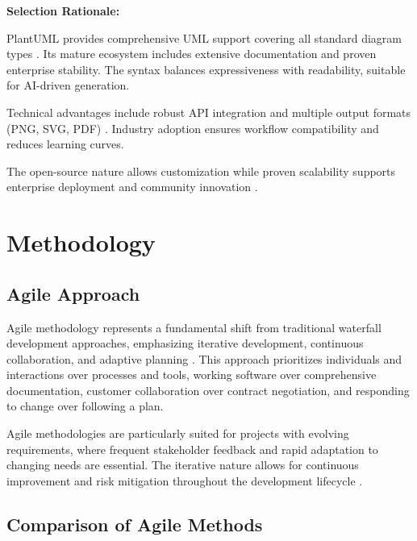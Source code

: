 \textbf{Selection Rationale:}

PlantUML provides comprehensive UML support covering all standard diagram types \cite{plantuml_documentation}. Its mature ecosystem includes extensive documentation and proven enterprise stability. The syntax balances expressiveness with readability, suitable for AI-driven generation.

Technical advantages include robust API integration and multiple output formats (PNG, SVG, PDF) \cite{plantuml_formats}. Industry adoption ensures workflow compatibility and reduces learning curves.

The open-source nature allows customization while proven scalability supports enterprise deployment and community innovation \cite{plantuml_enterprise}.

\section{Methodology}

\subsection{Agile Approach}

Agile methodology represents a fundamental shift from traditional waterfall development approaches, emphasizing iterative development, continuous collaboration, and adaptive planning \cite{agile_manifesto}. This approach prioritizes individuals and interactions over processes and tools, working software over comprehensive documentation, customer collaboration over contract negotiation, and responding to change over following a plan.

Agile methodologies are particularly suited for projects with evolving requirements, where frequent stakeholder feedback and rapid adaptation to changing needs are essential. The iterative nature allows for continuous improvement and risk mitigation throughout the development lifecycle \cite{agile_benefits}.

\subsection{Comparison of Agile Methods}

